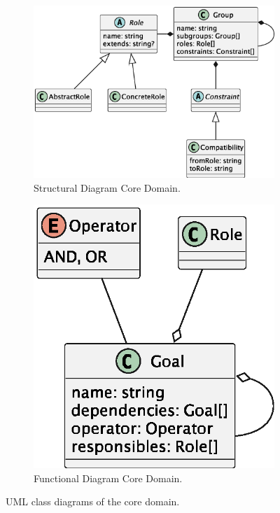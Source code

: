 \begin{figure}
    \begin{subfigure}[h]{0.6\linewidth}
        \centering
        \includegraphics[width=0.9\linewidth]{images/uml/structural-uml.eps}
        \caption{Structural Diagram Core Domain.}
        \label{fig:uml-structural}
    \end{subfigure}
    \begin{subfigure}[h]{0.3\linewidth}
        \centering
        \includegraphics[width=0.9\linewidth]{images/uml/functional-uml.eps}
        \caption{Functional Diagram Core Domain.}
        \label{fig:uml-functional}
    \end{subfigure}
    \caption{UML class diagrams of the core domain.}
    \label{fig:uml-core-domain}
\end{figure}

